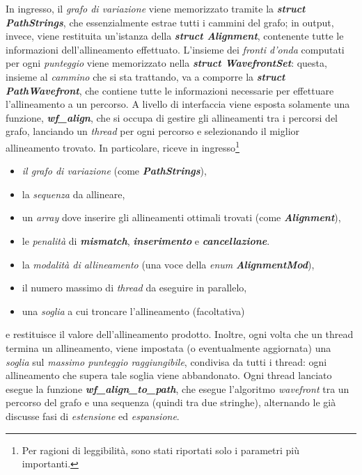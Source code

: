     In ingresso, il \emph{grafo di variazione} viene memorizzato tramite la \textbf{\textit{struct PathStrings}}, che essenzialmente estrae tutti i cammini del grafo; in output, invece, viene restituita un'istanza della \textbf{\textit{struct Alignment}}, contenente tutte le informazioni dell'allineamento effettuato.
    L'insieme dei \emph{fronti d'onda} computati per ogni \emph{punteggio} viene memorizzato nella \textbf{\textit{struct WavefrontSet}}: questa, insieme al \emph{cammino} che si sta trattando, va a comporre la \textbf{\textit{struct PathWavefront}}, che contiene tutte le informazioni necessarie per effettuare l'allineamento a un percorso.
    A livello di interfaccia viene esposta solamente una funzione, \textbf{\textit{wf\_align}}, che si occupa di gestire gli allineamenti tra i percorsi del grafo, lanciando un \emph{thread} per ogni percorso e selezionando il miglior allineamento trovato. In particolare, riceve in ingresso\footnote{Per ragioni di leggibilità, sono stati riportati solo i parametri più importanti.}
    \begin{itemize}
        \item \emph{il grafo di variazione} (come \textbf{\textit{PathStrings}}),
        \item la \emph{sequenza} da allineare,
        \item un \emph{array} dove inserire gli allineamenti ottimali trovati (come \textbf{\textit{Alignment}}),
        \item le \emph{penalità} di \textbf{\textit{mismatch}}, \textbf{\textit{inserimento}} e \textbf{\textit{cancellazione}}.
        \item la \emph{modalità di allineamento} (una voce della \emph{enum} \textbf{\textit{AlignmentMod}}),
        \item il numero massimo di \emph{thread} da eseguire in parallelo,
        \item una \emph{soglia} a cui troncare l'allineamento (facoltativa)
    \end{itemize}
    e restituisce il valore dell'allineamento prodotto. Inoltre, ogni volta che un thread termina un allineamento, viene impostata (o eventualmente aggiornata) una \emph{soglia} sul \emph{massimo punteggio raggiungibile}, condivisa da tutti i thread: ogni allineamento che supera tale soglia viene abbandonato. 
    Ogni thread lanciato esegue la funzione \textbf{\textit{wf\_align\_to\_path}}, che esegue l'algoritmo \emph{wavefront} tra un percorso del grafo e una sequenza (quindi tra due stringhe), alternando le già discusse fasi di \emph{estensione} ed \emph{espansione}.
\clearpage

